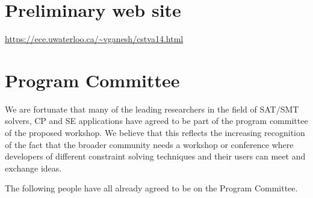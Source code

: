 \documentclass{sig-alternate}
\begin{document}

\section{Preliminary web site}
\vspace{0.2cm} \url{https://ece.uwaterloo.ca/~vganesh/cstva14.html}

\section{Program Committee}
\vspace{0.2cm} We are fortunate that many of the leading researchers
in the field of SAT/SMT solvers, CP and SE applications have agreed to
be part of the program committee of the proposed workshop. We believe
that this reflects the increasing recognition of the fact that the
broader community needs a workshop or conference where developers of
different constraint solving techniques and their users can meet and
exchange ideas.

\vspace{0.2cm}
The following people have all already agreed to be on the Program
Committee.
\end{document}
